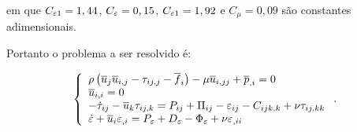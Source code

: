 \documentclass[_ArquivoPrincipal.tex]{subfiles}
\begin{document}
\noindent em que $C_{\varepsilon 1}=1,44$, $C_\varepsilon=0,15$, $C_{\varepsilon 1}=1,92$ e $C_\mu=0,09$ são constantes adimensionais.

Portanto o problema a ser resolvido é:

\begin{equation}
    \left\{
    \begin{array}{l}
        \rho\left({\overline{u}_j\overline{u}_{i,j}-\tau_{ij,j}-\overline{f}_i}\right)-\mu\overline{u}_{i,jj}+\overline{p}_{,i}=0       \\
        \overline{u}_{i,i}=0                                                                                  \\
        -\dot{\tau}_{ij}-\overline{u}_k\tau_{ij,k}=P_{ij}+\Pi_{ij}-\varepsilon_{ij}-C_{ijk,k}+\nu\tau_{ij,kk} \\
        \dot{\varepsilon}+\overline{u}_i\varepsilon_{,i}=P_\varepsilon+D_\varepsilon-\Phi_\varepsilon+\nu\varepsilon_{,ii}
    \end{array}
    \right.\text{.}
\end{equation}
\end{document}
